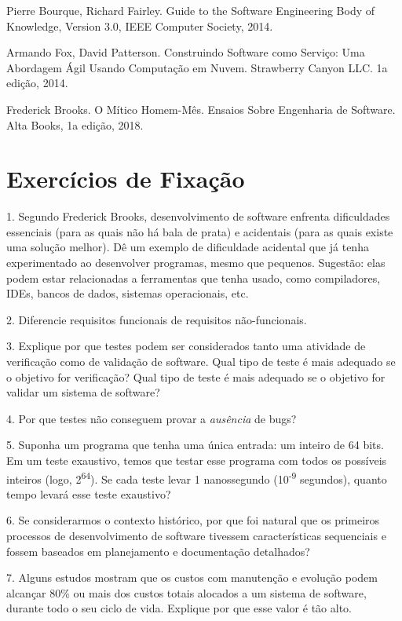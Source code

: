 \documentclass[
  11pt,
  twoside]{book}
\begin{document}
Pierre Bourque, Richard Fairley. Guide to the Software Engineering Body
of Knowledge, Version 3.0, IEEE Computer Society, 2014.

Armando Fox, David Patterson. Construindo Software como Serviço: Uma
Abordagem Ágil Usando Computação em Nuvem. Strawberry Canyon LLC. 1a
edição, 2014.

Frederick Brooks. O Mítico Homem-Mês. Ensaios Sobre Engenharia de
Software. Alta Books, 1a edição, 2018.

\hypertarget{exercuxedcios-de-fixauxe7uxe3o}{%
\section*{Exercícios de Fixação}\label{exercuxedcios-de-fixauxe7uxe3o}}

1. Segundo Frederick Brooks, desenvolvimento de software enfrenta
dificuldades essenciais (para as quais não há bala de prata) e
acidentais (para as quais existe uma solução melhor). Dê um exemplo de
dificuldade acidental que já tenha experimentado ao desenvolver
programas, mesmo que pequenos. Sugestão: elas podem estar relacionadas a
ferramentas que tenha usado, como compiladores, IDEs, bancos de dados,
sistemas operacionais, etc.

2. Diferencie requisitos funcionais de requisitos não-funcionais.

3. Explique por que testes podem ser considerados tanto uma atividade de
verificação como de validação de software. Qual tipo de teste é mais
adequado se o objetivo for verificação? Qual tipo de teste é mais
adequado se o objetivo for validar um sistema de software?

4. Por que testes não conseguem provar a \emph{ausência} de bugs?

5. Suponha um programa que tenha uma única entrada: um inteiro de 64
bits. Em um teste exaustivo, temos que testar esse programa com todos os
possíveis inteiros (logo, 2\textsuperscript{64}). Se cada teste levar 1
nanossegundo (10\textsuperscript{-9} segundos), quanto tempo levará esse
teste exaustivo?

6. Se considerarmos o contexto histórico, por que foi natural que os
primeiros processos de desenvolvimento de software tivessem
características sequenciais e fossem baseados em planejamento e
documentação detalhados?

7. Alguns estudos mostram que os custos com manutenção e evolução podem
alcançar 80\% ou mais dos custos totais alocados a um sistema de
software, durante todo o seu ciclo de vida. Explique por que esse valor
é tão alto.
\end{document}
